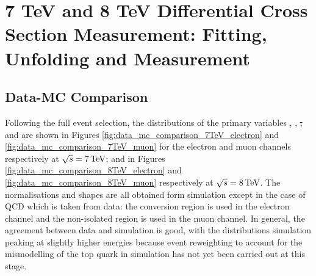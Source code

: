 \chapter{7 TeV and 8 TeV Differential Cross Section Measurement: Fitting, Unfolding and Measurement}
\label{c:Differential_Cross_Section:fitting_and_unfolding}


\section{Data-MC Comparison}
\label{ss:data-mc_comparison}
Following the full event selection, the distributions of the primary variables \met, \HT, \st, \wpt and \mt
are shown in Figures \ref{fig:data_mc_comparison_7TeV_electron} and \ref{fig:data_mc_comparison_7TeV_muon} for
the electron and muon channels respectively at $\sqrt{s}=7\,\text{Te\hspace{-.08em}V}$; and in Figures
\ref{fig:data_mc_comparison_8TeV_electron} and \ref{fig:data_mc_comparison_8TeV_muon} respectively at
$\sqrt{s}=8\,\text{Te\hspace{-.08em}V}$. The normalisations and shapes are all obtained form simulation except in the case of QCD
which is taken from data: the conversion region is used in the electron channel and the non-isolated region is
used in the muon channel. In general, the agreement between data and simulation is good, with the
distributions simulation peaking at slightly higher energies because event reweighting to account for the \pt
mismodelling of the top quark in simulation has not yet been carried out at this stage.

